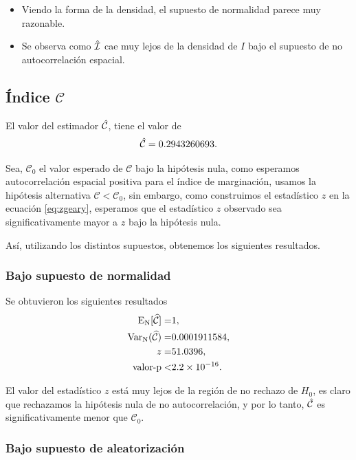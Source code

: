 \begin{itemize}
\item Viendo la forma de la densidad, el supuesto de normalidad parece muy razonable.  
\item Se observa como $\Hat{\mathcal{I}}$ cae muy lejos de la densidad de $I$ bajo el supuesto de no autocorrelación espacial. 
\end{itemize}



\subsection{Índice $\mathcal{C}$}
El valor del estimador $\Hat{\mathcal{C}}$, tiene el valor de 
\begin{equation}
\Hat{\mathcal{C}} = 0.2943260693 .
\end{equation}

Sea, $\mathcal{C}_0$ el valor esperado de $\mathcal{C}$ bajo la hipótesis nula, como esperamos autocorrelación espacial positiva para el índice de marginación, usamos la hipótesis alternativa $\mathcal{C}<\mathcal{C}_0$, sin embargo, como construimos el estadístico $z$ en la ecuación \ref{eq:zgeary}, esperamos que el estadístico $z$ observado sea significativamente mayor a $z$ bajo la hipótesis nula.


Así, utilizando los distintos supuestos, obtenemos los siguientes resultados.

\subsubsection{Bajo supuesto de normalidad}
Se obtuvieron los siguientes resultados
\begin{align*}
{\rm{E_N}} [\widehat{\mathcal{C}}] =& 1,  \\ 
{\rm{Var_N}}(\widehat{\mathcal{C}}) =& 0.0001911584, \\
z =& 51.0396, \\
\mbox{valor-p} <& 2.2 \times 10^{-16}.
\end{align*}

El valor del estadístico $z$ está muy lejos de la región de no rechazo de $H_0$, es claro que rechazamos la hipótesis nula de no autocorrelación, y por lo tanto, $\Hat{\mathcal{C}}$ es significativamente menor que $\mathcal{C}_0$.


\subsubsection{Bajo supuesto de aleatorización}

